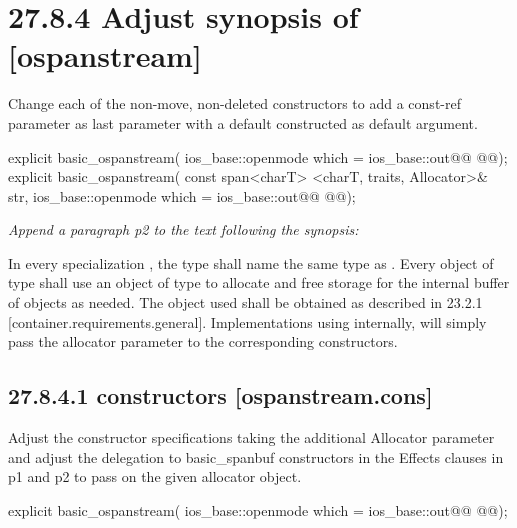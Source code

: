 \documentclass[ebook,11pt,article]{memoir}
\begin{document}
\section{27.8.4 Adjust synopsis of  [ospanstream]}
Change each of the non-move, non-deleted constructors to add a const-ref  parameter as last parameter with a default constructed  as default argument. 
\begin{codeblock}
explicit basic_ospanstream(
             ios_base::openmode which = ios_base::out@\ins{,}@
             @@);
explicit basic_ospanstream(
             const span<charT> <charT, traits, Allocator>& str,
             ios_base::openmode which = ios_base::out@\ins{,}@
             @@);
\end{codeblock}

\textit{Append a paragraph p2 to the text following the synopsis:}

\begin{insrt}
\pnum
In every specialization , the type  shall name the same type as . Every object of type  shall use an object of type  to allocate and free storage for the internal buffer of  objects as needed. The  object used shall be obtained as described in 23.2.1 [container.requirements.general].
\enternote
Implementations using  internally, will simply pass the allocator parameter to the corresponding  constructors.
\exitnote
\end{insrt}


\subsection{27.8.4.1  constructors [ospanstream.cons]}
Adjust the constructor specifications taking the additional Allocator parameter and adjust the delegation to basic_spanbuf constructors in the Effects clauses in p1 and p2 to pass on the given allocator object.

\begin{itemdecl}
explicit basic_ospanstream(
  ios_base::openmode which = ios_base::out@\ins{,}@
  @@);
\end{itemdecl}
\end{document}
